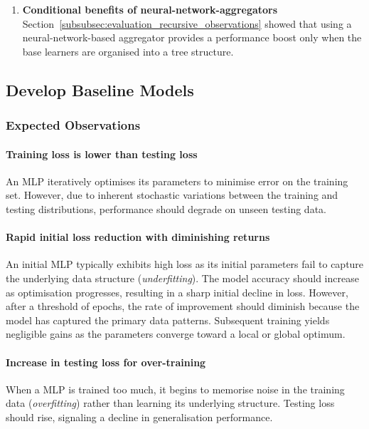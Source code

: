 \begin{enumerate}
    \item \textbf{Conditional benefits of neural-network-aggregators} \\
    Section~\ref{subsubsec:evaluation_recursive_observations} showed that using a neural-network-based aggregator provides a performance boost only when the base learners are organised into a tree structure. 
\end{enumerate}


\subsection{Develop Baseline Models}
\label{subsec:evaluation_baseline}
\subsubsection{Expected Observations}
\paragraph{Training loss is lower than testing loss}
An MLP iteratively optimises its parameters to minimise error on the training set. However, due to inherent stochastic variations between the training and testing distributions, performance should degrade on unseen testing data. 

\paragraph{Rapid initial loss reduction with diminishing returns}
An initial MLP typically exhibits high loss as its initial parameters fail to capture the underlying data structure (\textit{underfitting}). The model accuracy should increase as optimisation progresses, resulting in a sharp initial decline in loss. However, after a threshold of epochs, the rate of improvement should diminish because the model has captured the primary data patterns. Subsequent training yields negligible gains as the parameters converge toward a local or global optimum. 

\paragraph{Increase in testing loss for over-training}
When a MLP is trained too much, it begins to memorise noise in the training data (\textit{overfitting}) rather than learning its underlying structure. Testing loss should rise, signaling a decline in generalisation performance. 

